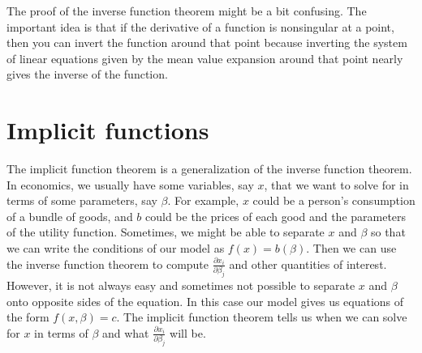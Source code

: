 \documentclass[12pt,reqno]{amsart}
\theoremstyle{definition}
\begin{document}
The proof of the inverse function theorem might be a bit
confusing. The important idea is that if the derivative of a function
is nonsingular at a point, then you can invert the function around
that point because inverting the system of linear equations given by
the mean value expansion around that point nearly gives the inverse of
the function. 

\section{Implicit functions}

The implicit function theorem is a generalization of the inverse
function theorem. In economics, we usually have some variables, say
$x$, that we want to solve for in terms of some parameters, say
$\beta$. For example, $x$ could be a person's consumption of a bundle of
goods, and $b$ could be the prices of each good and the parameters of
the utility function. Sometimes, we might be able to separate $x$ and
$\beta$ so that we can write the conditions of our model as $f(x) =
b(\beta)$. Then we can use the inverse function theorem to compute
$\frac{\partial x_i}{  \partial \beta_j}$ and other quantities of
interest. However, it is not always easy and sometimes not possible to
separate $x$ and $\beta$ onto opposite sides of the equation. In this
case our model gives us equations of the form $f(x,\beta) = c$. The
implicit function theorem tells us when we can solve for $x$ in terms
of $\beta$ and what $\frac{\partial x_i}{\partial \beta_j}$ will be.
\end{document}
